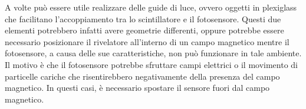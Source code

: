 A volte può essere utile realizzare delle guide di luce, ovvero oggetti in plexiglass che facilitano l'accoppiamento tra lo scintillatore e il fotosensore. Questi due elementi potrebbero infatti avere geometrie differenti, oppure potrebbe essere necessario posizionare il rivelatore all'interno di un campo magnetico mentre il fotosensore, a causa delle sue caratteristiche, non può funzionare in tale ambiente. Il motivo è che il fotosensore potrebbe sfruttare campi elettrici o il movimento di particelle cariche che risentirebbero negativamente della presenza del campo magnetico. In questi casi, è necessario spostare il sensore fuori dal campo magnetico.

\begin{figure}[H]
   \centering
\end{figure}


